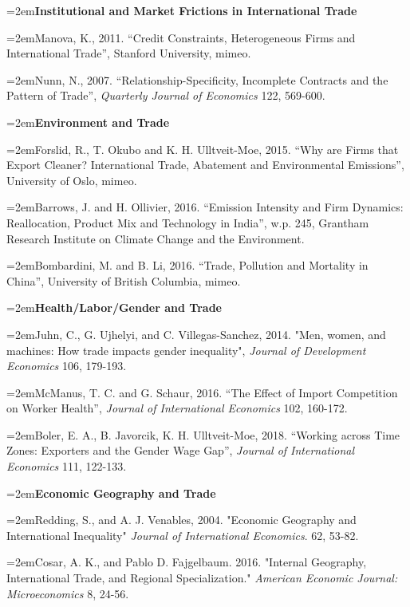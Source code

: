 \documentclass[10pt]{article}
\newcommand{\reading}{\par\hangindent=2em\hangafter=1\noindent}
\newenvironment{readingsblock}{%
  \begin{adjustwidth}{2em}{0pt} %
}{%
  \end{adjustwidth}
}
\begin{document}
  \begin{readingsblock}
  
  \reading \textbf{Institutional and Market Frictions in International Trade} \\[4pt]
  
  \reading Manova, K., 2011. “Credit Constraints, Heterogeneous Firms and International Trade”, Stanford University, mimeo.
  \reading Nunn, N., 2007. “Relationship-Specificity, Incomplete Contracts and the Pattern of Trade”, {\it Quarterly Journal of Economics} 122, 569-600. \\[4pt]
  
  \reading \textbf{Environment and Trade} \\[4pt]
  
  \reading Forslid, R., T. Okubo and K. H. Ulltveit-Moe, 2015. “Why are Firms that Export Cleaner? International Trade, Abatement and Environmental Emissions”, University of Oslo, mimeo.
  \reading Barrows, J. and H. Ollivier, 2016. “Emission Intensity and Firm Dynamics: Reallocation, Product Mix and Technology in India”, w.p. 245, Grantham Research Institute on Climate Change and the Environment.
  \reading Bombardini, M. and B. Li, 2016. “Trade, Pollution and Mortality in China”, University of British Columbia, mimeo. \\[4pt]
  
  \reading \textbf{Health/Labor/Gender and Trade} \\[4pt]
  
  \reading Juhn, C., G. Ujhelyi, and C. Villegas-Sanchez, 2014. "Men, women, and machines: How trade impacts gender inequality", {\it Journal of Development Economics} 106, 179-193.
  \reading McManus, T. C. and G. Schaur, 2016. “The Effect of Import Competition on Worker Health”, {\it Journal of International Economics} 102, 160-172.
  \reading Boler, E. A., B. Javorcik, K. H. Ulltveit-Moe, 2018. “Working across Time Zones: Exporters and the Gender Wage Gap”, {\it Journal of International Economics} 111, 122-133. \\[4pt]

  \reading \textbf{Economic Geography and Trade} \\[4pt]
  
  \reading Redding, S., and A. J. Venables, 2004. "Economic Geography and International Inequality" {\it Journal of International Economics}. 62, 53-82.
  \reading Cosar, A. K., and Pablo D. Fajgelbaum. 2016. "Internal Geography, International Trade, and Regional Specialization." {\it American Economic Journal: Microeconomics} 8, 24-56. \\[4pt]
  
  \end{readingsblock}
  
\end{document}
